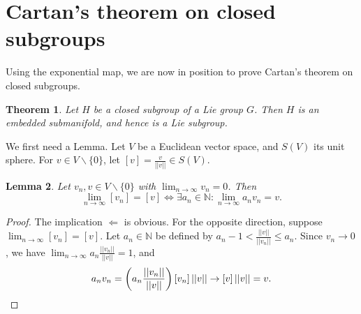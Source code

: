 \documentclass{article}
\newtheorem{theorem}{Theorem}[section]
\newtheorem{lemma}[theorem]{Lemma}
\theoremstyle{remark}
\newcommand{\N}{\mathbb{N}}
\newcommand{\R}{\mathbb{R}}
\newcommand{\on}{\operatorname}
\newcommand{\SL}{ \on{SL}}
\newcommand{\f}{\frac}
\newcommand{\mf}{\mathfrak}
\begin{document}










\section{Cartan's theorem on closed subgroups}
%
Using the exponential map, we are now in position to prove Cartan's theorem on closed subgroups. 
%
\begin{theorem}
Let $H$ be a closed subgroup of a Lie group $G$. Then $H$ is an embedded submanifold, and hence is a Lie subgroup.  
\end{theorem}
We first need a Lemma. 
Let $V$ be a Euclidean vector space, and $S(V)$ its unit sphere. For $v\in V\backslash\{0\}$, let 
$[v]=\f{v}{||v||}\in S(V)$.   

\begin{lemma}
Let $v_n,v\in V\backslash\{0\}$ with $\lim_{n\to \infty}v_n=0$. Then 
\[ \lim_{n\to \infty} [v_n]=[v] \Leftrightarrow \exists a_n\in\N\colon \lim_{n\to \infty} a_nv_n=v.\]
\end{lemma}
\begin{proof} The implication $\Leftarrow$ is obvious. For the opposite direction, 
suppose $\lim_{n\to \infty} [v_n]=[v] $. 
Let $a_n\in\N$ be defined by $a_n-1<\f{||v||}{||v_n||}\le a_n$. Since $v_n\to 0$, we have 
$\lim_{n\to \infty} a_n  \f{||v_n||}{||v||}=1$, and  
\[ a_n v_n =\left(a_n  \f{||v_n||}{||v||}\right) [v_n]\, ||v||\to [v]\,||v||=v.\qedhere\]
%   
\end{proof}
\end{document}
